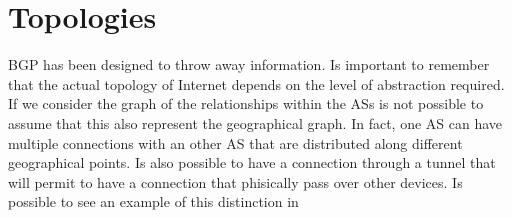 \section{Topologies}
\label{sec:topologies}

%

\ac{BGP} has been designed to throw away information.
Is important to remember that the actual topology of Internet depends on the
level of abstraction required.
If we consider the graph of the relationships within the \acp{AS} is not
possible to assume that this also represent the geographical graph.
In fact, one \ac{AS} can have multiple connections with an other \ac{AS}
that are distributed along different geographical points.
Is also possible to have a connection through a tunnel that will permit to have
a connection that phisically pass over other devices.
Is possible to see an example of this distinction in 

